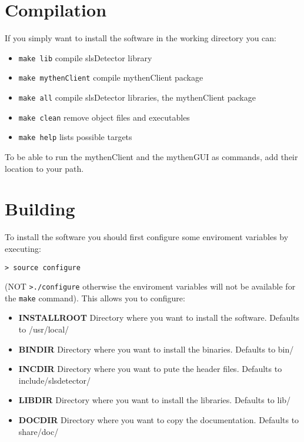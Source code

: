 \documentclass{report}
\begin{document}
\section{Compilation} 
If you simply want to install the software in the working directory you can:
\begin{itemize}
\item \verb=make lib=     	compile slsDetector library
\item \verb=make mythenClient=  	compile mythenClient package
\item \verb=make all=	compile slsDetector libraries, the mythenClient package 
\item \verb=make clean=              remove object files and executables
\item \verb=make help=               lists possible targets
\end{itemize}

To be able to run the mythenClient and the mythenGUI as commands, add their location to your path.


\section{Building}
To install the software you should first configure some enviroment variables by executing: 
\begin{verbatim}
> source configure
\end{verbatim}
(NOT \verb=>./configure= otherwise the enviroment variables will not be available for the \verb=make= command). 
This allows you to configure:
\begin{itemize}
\item \textbf{INSTALLROOT} Directory where you want to install the software. Defaults to /usr/local/
\item \textbf{BINDIR} Directory where you want to install the binaries. Defaults to bin/
\item \textbf{INCDIR} Directory where you want to pute the header files. Defaults to include/slsdetector/
\item \textbf{LIBDIR} Directory where you want to install the libraries. Defaults to lib/
\item \textbf{DOCDIR} Directory where you want to copy the documentation. Defaults to share/doc/
\end{itemize}
\end{document}
